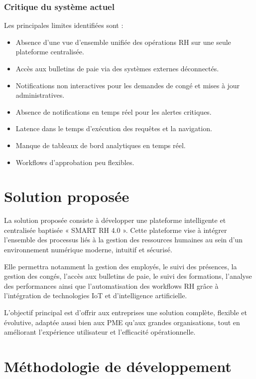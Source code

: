 \subsubsection*{Critique du système actuel}

Les principales limites identifiées sont :

\begin{itemize}
    \item Absence d'une vue d'ensemble unifiée des opérations RH sur une seule plateforme centralisée.
    \item Accès aux bulletins de paie via des systèmes externes déconnectés.
    \item Notifications non interactives pour les demandes de congé et mises à jour administratives.
    \item Absence de notifications en temps réel pour les alertes critiques.
    \item Latence dans le temps d'exécution des requêtes et la navigation.
    \item Manque de tableaux de bord analytiques en temps réel.
    \item Workflows d'approbation peu flexibles.
\end{itemize}

\section{Solution proposée}

La solution proposée consiste à développer une plateforme intelligente et centralisée baptisée « SMART RH 4.0 ». Cette plateforme vise à intégrer l'ensemble des processus liés à la gestion des ressources humaines au sein d'un environnement numérique moderne, intuitif et sécurisé.

Elle permettra notamment la gestion des employés, le suivi des présences, la gestion des congés, l'accès aux bulletins de paie, le suivi des formations, l'analyse des performances ainsi que l'automatisation des workflows RH grâce à l'intégration de technologies IoT et d'intelligence artificielle.

L'objectif principal est d'offrir aux entreprises une solution complète, flexible et évolutive, adaptée aussi bien aux PME qu'aux grandes organisations, tout en améliorant l'expérience utilisateur et l'efficacité opérationnelle.

\section{Méthodologie de développement}

